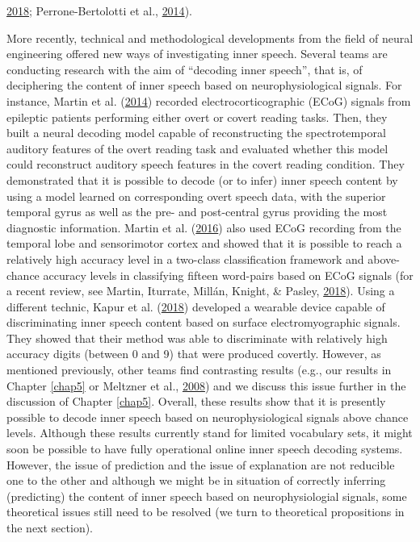 \documentclass[a4paper,12pt,twoside,onecolumn,openright,final,oldfontcommands]{memoir}
\begin{document}
\protect\hyperlink{ref-loevenbruck_cognitive_2018}{2018}; Perrone-Bertolotti et al., \protect\hyperlink{ref-Perrone-Bertolotti2014}{2014}).

More recently, technical and methodological developments from the field of neural engineering offered new ways of investigating inner speech. Several teams are conducting research with the aim of \enquote{decoding inner speech}, that is, of deciphering the content of inner speech based on neurophysiological signals. For instance, Martin et al. (\protect\hyperlink{ref-martin_decoding_2014}{2014}) recorded electrocorticographic (ECoG) signals from epileptic patients performing either overt or covert reading tasks. Then, they built a neural decoding model capable of reconstructing the spectrotemporal auditory features of the overt reading task and evaluated whether this model could reconstruct auditory speech features in the covert reading condition. They demonstrated that it is possible to decode (or to infer) inner speech content by using a model learned on corresponding overt speech data, with the superior temporal gyrus as well as the pre- and post-central gyrus providing the most diagnostic information. Martin et al. (\protect\hyperlink{ref-martin_word_2016}{2016}) also used ECoG recording from the temporal lobe and sensorimotor cortex and showed that it is possible to reach a relatively high accuracy level in a two-class classification framework and above-chance accuracy levels in classifying fifteen word-pairs based on ECoG signals (for a recent review, see Martin, Iturrate, Millán, Knight, \& Pasley, \protect\hyperlink{ref-martin_decoding_2018}{2018}). Using a different technic, Kapur et al. (\protect\hyperlink{ref-kapur_alterego_2018}{2018}) developed a wearable device capable of discriminating inner speech content based on surface electromyographic signals. They showed that their method was able to discriminate with relatively high accuracy digits (between 0 and 9) that were produced covertly. However, as mentioned previously, other teams find contrasting results (e.g., our results in Chapter \ref{chap5} or Meltzner et al., \protect\hyperlink{ref-meltzner_speech_2008}{2008}) and we discuss this issue further in the discussion of Chapter \ref{chap5}. Overall, these results show that it is presently possible to decode inner speech based on neurophysiological signals above chance levels. Although these results currently stand for limited vocabulary sets, it might soon be possible to have fully operational online inner speech decoding systems. However, the issue of prediction and the issue of explanation are not reducible one to the other and although we might be in situation of correctly inferring (predicting) the content of inner speech based on neurophysiologial signals, some theoretical issues still need to be resolved (we turn to theoretical propositions in the next section).
\end{document}
